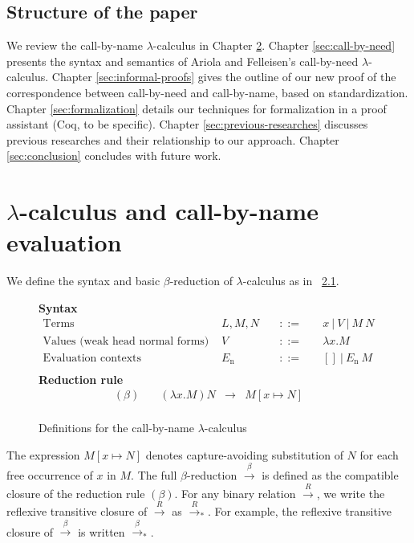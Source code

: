 \documentclass[english]{sumiilab-paper}
\newcommand{\FULLBETA}{\xrightarrow{\beta}}
\newcommand{\RTCLOS}[1]{#1_*}
\begin{document}
\section{Structure of the paper}
We review the call-by-name $\lambda$-calculus in Chapter \ref{sec:call-by-name}.
Chapter \ref{sec:call-by-need} presents the syntax and semantics of Ariola and Felleisen's call-by-need $\lambda$-calculus.
Chapter \ref{sec:informal-proofs} gives the outline of our new proof of the correspondence between call-by-need and call-by-name, based on standardization.
Chapter \ref{sec:formalization} details our techniques for formalization in a proof assistant (Coq, to be specific).
Chapter \ref{sec:previous-researches} discusses previous researches and their relationship to our approach.
Chapter \ref{sec:conclusion} concludes with future work.
%
\chapter{$\lambda$-calculus and call-by-name evaluation}\label{sec:call-by-name}
%
We define the syntax and basic $\beta$-reduction of $\lambda$-calculus as in \figurename~\ref{call-by-name-lambda-calculus}.
%
\begin{figure}[tp]
	\textbf{Syntax}
	\[ \begin{array}{llcl}
		\mbox{Terms}\quad & L,M,N\quad & ::=\quad & x~|~V~|~M~N \\
		\mbox{Values (weak head normal forms)}\quad & V\quad & ::=\quad & \lambda x.M \\
		\mbox{Evaluation contexts}\quad & E_\mathrm{n}\quad & ::=\quad & [] ~|~ E_\mathrm{n}~M \\
	\end{array} \]
	\textbf{Reduction rule}
	\[ \begin{array}{lrcl}
		(\beta)\quad & (\lambda x.M)N & \rightarrow & M[x \mapsto N] \\
	\end{array} \]
	\caption{Definitions for the call-by-name $\lambda$-calculus}
	\label{call-by-name-lambda-calculus}
\end{figure}
%
The expression $M[x\mapsto N]$ denotes capture-avoiding substitution of $N$ for each free occurrence of $x$ in $M$.
The full $\beta$-reduction $\FULLBETA$ is defined as the compatible closure of the reduction rule $(\beta)$.
For any binary relation $\xrightarrow{R}$, we write the reflexive transitive closure of $\xrightarrow{R}$ as $\xrightarrow{R}_*$.
For example, the reflexive transitive closure of $\FULLBETA$ is written $\RTCLOS{\FULLBETA}$.
\end{document}
